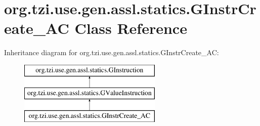 \hypertarget{classorg_1_1tzi_1_1use_1_1gen_1_1assl_1_1statics_1_1_g_instr_create___a_c}{\section{org.\-tzi.\-use.\-gen.\-assl.\-statics.\-G\-Instr\-Create\-\_\-\-A\-C Class Reference}
\label{classorg_1_1tzi_1_1use_1_1gen_1_1assl_1_1statics_1_1_g_instr_create___a_c}
}
Inheritance diagram for org.\-tzi.\-use.\-gen.\-assl.\-statics.\-G\-Instr\-Create\-\_\-\-A\-C\-:\begin{figure}[H]
\begin{center}
\leavevmode
\includegraphics[height=3.000000cm]{classorg_1_1tzi_1_1use_1_1gen_1_1assl_1_1statics_1_1_g_instr_create___a_c}
\end{center}
\end{figure}
